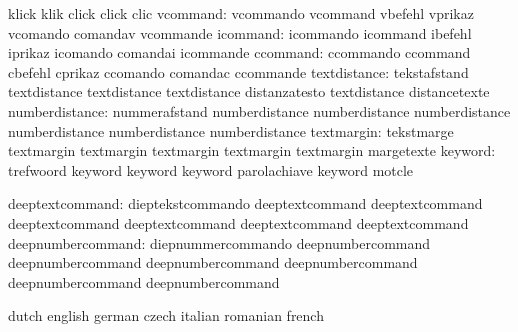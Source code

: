                            klick                     klik
                           click                     click
                           clic
                 vcommand: vcommando                 vcommand
                           vbefehl                   vprikaz
                           vcomando                  comandav
                           vcommande
                 icommand: icommando                 icommand
                           ibefehl                   iprikaz
                           icomando                  comandai
                           icommande
                 ccommand: ccommando                 ccommand
                           cbefehl                   cprikaz
                           ccomando                  comandac
                           ccommande
             textdistance: tekstafstand              textdistance
                           textdistance              textdistance
                           distanzatesto             textdistance
                           distancetexte
           numberdistance: nummerafstand             numberdistance
                           numberdistance            numberdistance
                           numberdistance            numberdistance
                           numberdistance
               textmargin: tekstmarge                textmargin
                           textmargin                textmargin
                           textmargin                textmargin
                           margetexte
                  keyword: trefwoord                 keyword
                           keyword                   keyword
                           parolachiave              keyword
                           motcle

          deeptextcommand: dieptekstcommando         deeptextcommand
                           deeptextcommand           deeptextcommand
                           deeptextcommand           deeptextcommand
                           deeptextcommand
        deepnumbercommand: diepnummercommando        deepnumbercommand
                           deepnumbercommand         deepnumbercommand
                           deepnumbercommand         deepnumbercommand
                           deepnumbercommand

\stopconstants


\startconstants            dutch                     english
                           german                    czech
                           italian                   romanian
                           french

